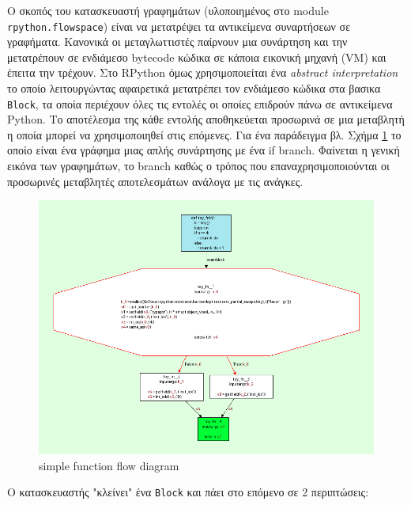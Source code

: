 Ο σκοπός του κατασκευαστή γραφημάτων (υλοποιημένος στο module
\texttt{rpython.flowspace}) είναι να μετατρέψει τα αντικείμενα συναρτήσεων σε
γραφήματα. Κανονικά οι μεταγλωττιστές παίρνουν μια συνάρτηση και την
μετατρέπουν σε ενδιάμεσο bytecode κώδικα σε κάποια εικονική μηχανή (VM) και
έπειτα την τρέχουν. Στο RPython όμως χρησιμοποιείται ένα \textit{abstract
interpretation} το οποίο λειτουργώντας αφαιρετικά μετατρέπει τον ενδιάμεσο
κώδικα στα βασικα \texttt{Block}, τα οποία περιέχουν όλες τις εντολές οι
οποίες επιδρούν πάνω σε αντικείμενα Python. Το αποτέλεσμα της κάθε εντολής
αποθηκεύεται προσωρινά σε μια μεταβλητή η οποία μπορεί να χρησιμοποιηθεί στις
επόμενες. Για ένα παράδειγμα βλ. Σχήμα \ref{figure-2} το οποίο είναι ένα
γράφημα μιας απλής συνάρτησης με ένα if branch. Φαίνεται η γενική εικόνα των
γραφημάτων, το branch καθώς ο τρόπος που επαναχρησιμοποιούνται οι προσωρινές
μεταβλητές αποτελεσμάτων ανάλογα με τις ανάγκες.

\begin{figure}[h]
\centering
\includegraphics[width=\textwidth]{simple-func-bef.png}
\caption{simple function flow diagram}
\label{figure-2}
\end{figure}

Ο κατασκευαστής "κλείνει" ένα \texttt{Block} και πάει στο επόμενο σε 2 
περιπτώσεις:

